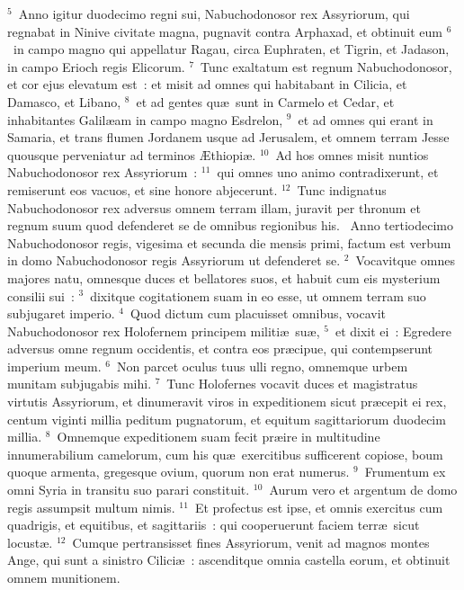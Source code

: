 ${}^{5}$~Anno igitur duodecimo regni sui, Nabuchodonosor rex Assyriorum, qui regnabat in Ninive civitate magna, pugnavit contra Arphaxad, et obtinuit eum
${}^{6}$~in campo magno qui appellatur Ragau, circa Euphraten, et Tigrin, et Jadason, in campo Erioch regis Elicorum.
${}^{7}$~Tunc exaltatum est regnum Nabuchodonosor, et cor ejus elevatum est~: et misit ad omnes qui habitabant in Cilicia, et Damasco, et Libano,
${}^{8}$~et ad gentes qu\ae\ sunt in Carmelo et Cedar, et inhabitantes Galil\ae am in campo magno Esdrelon,
${}^{9}$~et ad omnes qui erant in Samaria, et trans flumen Jordanem usque ad Jerusalem, et omnem terram Jesse quousque perveniatur ad terminos \AE thiopi\ae .
${}^{10}$~Ad hos omnes misit nuntios Nabuchodonosor rex Assyriorum~:
${}^{11}$~qui omnes uno animo contradixerunt, et remiserunt eos vacuos, et sine honore abjecerunt.
${}^{12}$~Tunc indignatus Nabuchodonosor rex adversus omnem terram illam, juravit per thronum et regnum suum quod defenderet se de omnibus regionibus his.
~Anno tertiodecimo Nabuchodonosor regis, vigesima et secunda die mensis primi, factum est verbum in domo Nabuchodonosor regis Assyriorum ut defenderet se.
${}^{2}$~Vocavitque omnes majores natu, omnesque duces et bellatores suos, et habuit cum eis mysterium consilii sui~:
${}^{3}$~dixitque cogitationem suam in eo esse, ut omnem terram suo subjugaret imperio.
${}^{4}$~Quod dictum cum placuisset omnibus, vocavit Nabuchodonosor rex Holofernem principem militi\ae\ su\ae ,
${}^{5}$~et dixit ei~: Egredere adversus omne regnum occidentis, et contra eos pr\ae cipue, qui contempserunt imperium meum.
${}^{6}$~Non parcet oculus tuus ulli regno, omnemque urbem munitam subjugabis mihi.
${}^{7}$~Tunc Holofernes vocavit duces et magistratus virtutis Assyriorum, et dinumeravit viros in expeditionem sicut pr\ae cepit ei rex, centum viginti millia peditum pugnatorum, et equitum sagittariorum duodecim millia.
${}^{8}$~Omnemque expeditionem suam fecit pr\ae ire in multitudine innumerabilium camelorum, cum his qu\ae\ exercitibus sufficerent copiose, boum quoque armenta, gregesque ovium, quorum non erat numerus.
${}^{9}$~Frumentum ex omni Syria in transitu suo parari constituit.
${}^{10}$~Aurum vero et argentum de domo regis assumpsit multum nimis.
${}^{11}$~Et profectus est ipse, et omnis exercitus cum quadrigis, et equitibus, et sagittariis~: qui cooperuerunt faciem terr\ae\ sicut locust\ae .
${}^{12}$~Cumque pertransisset fines Assyriorum, venit ad magnos montes Ange, qui sunt a sinistro Cilici\ae~: ascenditque omnia castella eorum, et obtinuit omnem munitionem.
